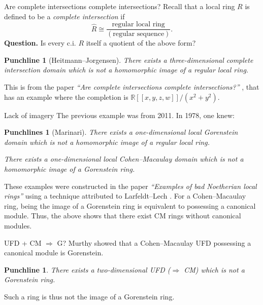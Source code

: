\documentclass{beamer}
\newtheorem{punchline}[theorem]{Punchline}
\newtheorem{punchlines}[theorem]{Punchlines}
\begin{document}
	\begin{frame}{Are complete intersections complete intersections?}
		Recall that a local ring $R$ is defined to be a \emph{complete intersection} if \pause
		\begin{equation*} 
			\widehat{R} \cong \dfrac{\text{regular local ring}}{(\text{regular sequence})}.
		\end{equation*} \pause
		\textbf{Question.} Is every c.i. $R$ itself a quotient of the above form? \pause

		\begin{punchline}[Heitmann--Jorgensen]
			There exists a three-dimensional complete intersection domain which is not a homomorphic image of a regular local ring.
		\end{punchline} \pause

		This is from the paper \emph{``Are complete intersections complete intersections?''} \cite{HeitmannJorgensen}, that has an example where the completion is $\mathbb{R}[\![x, y, z, w]\!]/(x^{2} + y^{2})$.	
	\end{frame}
	\begin{frame}{Lack of imagery}
		The previous example was from 2011. \pause In 1978, one knew: \pause
		\begin{punchlines}[Marinari] 
			There exists a one-dimensional local Gorenstein domain which is not a homomorphic image of a regular local ring. \pause

			There exists a one-dimensional local Cohen--Macaulay domain which is not a homomorphic image of a Gorenstein ring. 
		\end{punchlines} \pause
		These examples were constructed in the paper \emph{``Examples of bad Noetherian local rings''} \cite{MarinariBadNoetherian} \pause using a technique attributed to Larfeldt--Lech \cite{LarfeldtLech}. \pause \newline
		For a Cohen--Macaulay ring, being the image of a Gorenstein ring is equivalent to possessing a canonical module. \pause Thus, the above shows that there exist CM rings without canonical modules.
	\end{frame}
	\begin{frame}{UFD + CM \texorpdfstring{$\Rightarrow$}{=>} G?}
		 \pause Murthy \cite{MurthyUFD} showed that a Cohen--Macaulay UFD possessing a canonical module is Gorenstein. \pause
		\begin{punchline}
			There exists a two-dimensional UFD ($\Rightarrow$ CM) which is not a Gorenstein ring.
		\end{punchline} \pause
		Such a ring is thus not the image of a Gorenstein ring.
	\end{frame}
\end{document}
